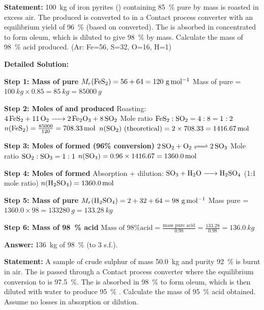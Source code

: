 \documentclass[11pt]{article}
\begin{document}
\begin{exoresolu}
\textbf{Statement:} \SI{100}{kg} of iron pyrites () containing \SI{85}{\%} pure  by mass is roasted in excess air. The  produced is converted to  in a Contact process converter with an equilibrium yield of \SI{96}{\%} (based on  converted). The  is absorbed in concentrated  to form oleum, which is diluted to give \SI{98}{\%}  by mass. Calculate the mass of \SI{98}{\%} acid produced. (Ar: Fe=56, S=32, O=16, H=1)

\tcblower
\textbf{Detailed Solution:}

\textbf{Step 1: Mass of pure }
$M_r(\ce{FeS2}) = 56 + 64 = 120\ \mathrm{g\,mol^{-1}}$
Mass of pure  = $\SI{100}{kg} \times 0.85 = \SI{85}{kg} = \SI{85000}{g}$

\textbf{Step 2: Moles of  and  produced}
Roasting: $\ce{4FeS2 + 11O2 -> 2Fe2O3 + 8SO2}$
Mole ratio $\ce{FeS2} : \ce{SO2} = 4 : 8 = 1 : 2$
$n(\ce{FeS2}) = \frac{85000}{120} = \SI{708.33}{mol}$
$n(\ce{SO2})\text{ (theoretical)} = 2 \times 708.33 = \SI{1416.67}{mol}$

\textbf{Step 3: Moles of  formed (96\% conversion)}
$\ce{2SO2 + O2 <=> 2SO3}$ \quad Mole ratio $\ce{SO2} : \ce{SO3} = 1 : 1$
$n(\ce{SO3}) = 0.96 \times 1416.67 = \SI{1360.0}{mol}$

\textbf{Step 4: Moles of  formed}
Absorption + dilution: $\ce{SO3 + H2O -> H2SO4}$ \quad (1:1 mole ratio)
$n(\ce{H2SO4}) = \SI{1360.0}{mol}$

\textbf{Step 5: Mass of pure }
$M_r(\ce{H2SO4}) = 2 + 32 + 64 = 98\ \mathrm{g\,mol^{-1}}$
Mass pure  = $1360.0 \times 98 = \SI{133280}{g} = \SI{133.28}{kg}$

\textbf{Step 6: Mass of \SI{98}{\%} acid}
$\text{Mass of 98\% acid} = \frac{\text{mass pure acid}}{0.98} = \frac{133.28}{0.98} = \SI{136.0}{kg}$

\textbf{Answer:} \SI{136}{kg} of \SI{98}{\%}  (to 3 s.f.).
\end{exoresolu}

\begin{exercice}
\textbf{Statement:} A sample of crude sulphur of mass \SI{50.0}{kg} and purity \SI{92}{\%} is burnt in air. The  is passed through a Contact process converter where the equilibrium conversion to  is \SI{97.5}{\%}. The  is absorbed in \SI{98}{\%}  to form oleum, which is then diluted with water to produce \SI{95}{\%} . Calculate the mass of \SI{95}{\%} acid obtained. Assume no losses in absorption or dilution.
\end{exercice}
\end{document}
